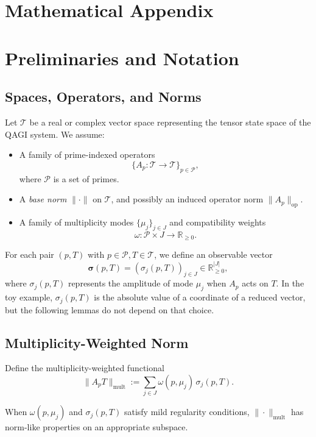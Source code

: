 \documentclass[11pt]{article}
\begin{document}
\appendix
\section*{Mathematical Appendix}

\section{Preliminaries and Notation}

\subsection{Spaces, Operators, and Norms}

Let \(\mathcal{T}\) be a real or complex vector space representing the tensor state space of the QAGI system.
We assume:
\begin{itemize}[leftmargin=1.5em]
  \item A family of prime-indexed operators
  \[
    \{A_p : \mathcal{T} \to \mathcal{T}\}_{p \in \mathcal{P}},
  \]
  where \(\mathcal{P}\) is a set of primes.
  \item A \emph{base norm} \(\|\cdot\|\) on \(\mathcal{T}\), and possibly an induced operator norm \(\|A_p\|_{\text{op}}\).
  \item A family of multiplicity modes \(\{\mu_j\}_{j \in J}\) and compatibility weights
  \[
    \omega : \mathcal{P} \times J \to \mathbb{R}_{\ge 0}.
  \]
\end{itemize}

For each pair \((p, T)\) with \(p \in \mathcal{P}, T \in \mathcal{T}\), we define an observable vector
\[
  \bm{\sigma}(p,T) = (\sigma_j(p,T))_{j \in J} \in \mathbb{R}_{\ge 0}^{|J|},
\]
where \(\sigma_j(p,T)\) represents the amplitude of mode \(\mu_j\) when \(A_p\) acts on \(T\).
In the toy example, \(\sigma_j(p,T)\) is the absolute value of a coordinate of a reduced vector, but the following lemmas do not depend on that choice.

\subsection{Multiplicity-Weighted Norm}

Define the multiplicity-weighted functional
\[
  \|A_p T\|_{\text{mult}} := \sum_{j \in J} \omega(p,\mu_j) \,\sigma_j(p,T).
\]

When \(\omega(p,\mu_j)\) and \(\sigma_j(p,T)\) satisfy mild regularity conditions, \(\|\cdot\|_{\text{mult}}\) has norm-like properties on an appropriate subspace.
\end{document}
